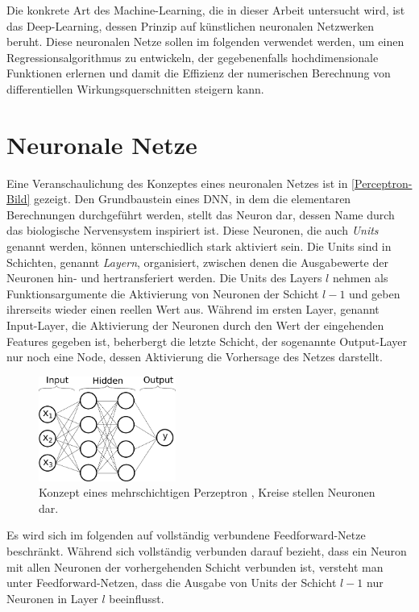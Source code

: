 Die konkrete Art des Machine-Learning, die in dieser Arbeit untersucht wird, ist das Deep-Learning, dessen Prinzip auf künstlichen neuronalen Netzwerken beruht. Diese neuronalen Netze sollen im folgenden verwendet werden, um einen Regressionsalgorithmus zu entwickeln, der gegebenenfalls hochdimensionale Funktionen erlernen und damit die Effizienz der numerischen Berechnung von differentiellen Wirkungsquerschnitten steigern kann. 
\section{Neuronale Netze}
Eine Veranschaulichung des Konzeptes eines neuronalen Netzes ist in \textsf{\autoref{Perceptron-Bild}} gezeigt.
Den Grundbaustein eines DNN, in dem die elementaren Berechnungen durchgeführt werden, stellt das Neuron dar, dessen Name durch das biologische Nervensystem inspiriert ist.
Diese Neuronen, die auch \textit{Units} genannt werden, können unterschiedlich stark aktiviert sein. Die Units sind in Schichten, genannt \textit{Layern}, organisiert, zwischen denen die Ausgabewerte der Neuronen hin- und hertransferiert werden. Die Units des Layers $l$ nehmen als Funktionsargumente die Aktivierung von Neuronen der Schicht $l-1$ und geben ihrerseits wieder einen reellen Wert aus. Während im ersten Layer, genannt Input-Layer, die Aktivierung der Neuronen durch den Wert der eingehenden Features gegeben ist, beherbergt die letzte Schicht, der sogenannte Output-Layer nur noch eine Node, dessen Aktivierung die Vorhersage des Netzes darstellt. 

\begin{figure}
	\includegraphics[width=0.4\textwidth]{graphics/NeuralNetwork}
	\caption{Konzept eines mehrschichtigen Perzeptron \cite{Perceptron}, Kreise stellen Neuronen dar.}
	
	\label{Perceptron-Bild}
\end{figure}
Es wird sich im folgenden auf vollständig verbundene Feedforward-Netze beschränkt. Während sich vollständig verbunden darauf bezieht, dass ein Neuron mit allen Neuronen der vorhergehenden Schicht verbunden ist, versteht man unter Feedforward-Netzen, dass die Ausgabe von Units der Schicht $l-1$ nur Neuronen in Layer $l$ beeinflusst.

